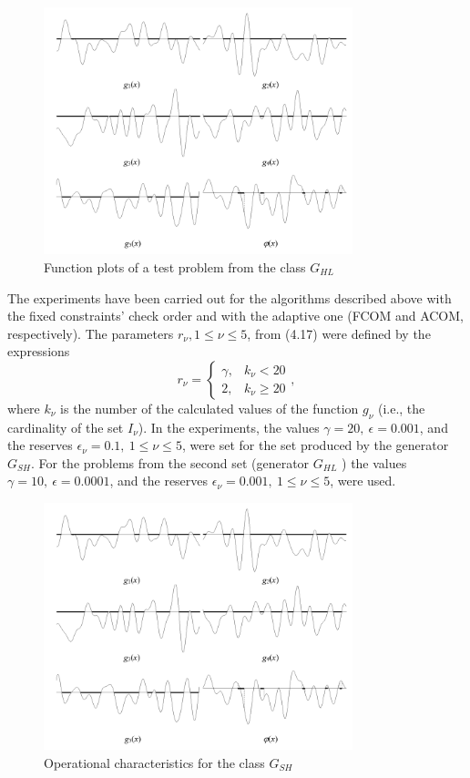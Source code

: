 \documentclass[graybox]{svmult}
\begin{document}
\begin{figure}[h]
  \label{fig:4_13}
  \centering
  \includegraphics[width=0.8\textwidth]{figures/4_13.png}
  \caption{Function plots of a test problem from the class $G_{HL}$}
\end{figure}

The experiments have been carried out for the algorithms described above with the fixed constraints’ check order and with the adaptive one (FCOM and ACOM, respectively). The parameters $r_\nu, 1\le\nu\le 5$, from (4.17) were defined by the expressions
\begin{displaymath}
  r_\nu = \left\{
  \begin{array}{lr}
    \gamma, & k_\nu < 20\\
    2, & k_\nu \ge 20
  \end{array}
  \right.,
\end{displaymath}
where $k_\nu$ is the number of the calculated values of the function $g_\nu$ (i.e., the cardinality of the set $I_\nu$). In the experiments, the values $\gamma=20,\: \epsilon = 0.001$, and the reserves $\epsilon_\nu=0.1,\: 1\le\nu\le 5$, were set for the set produced by the generator $G_{SH}$. For the problems from the second set (generator $G_{HL}$ ) the values  $\gamma=10,\: \epsilon = 0.0001$, and the reserves $\epsilon_\nu=0.001,\: 1\le\nu\le 5$, were used.

\begin{figure}[h]
  \label{fig:4_14}
  \centering
  \includegraphics[width=0.8\textwidth]{figures/4_13.png}
  \caption{Operational characteristics for the class $G_{SH}$}
\end{figure}
\end{document}
